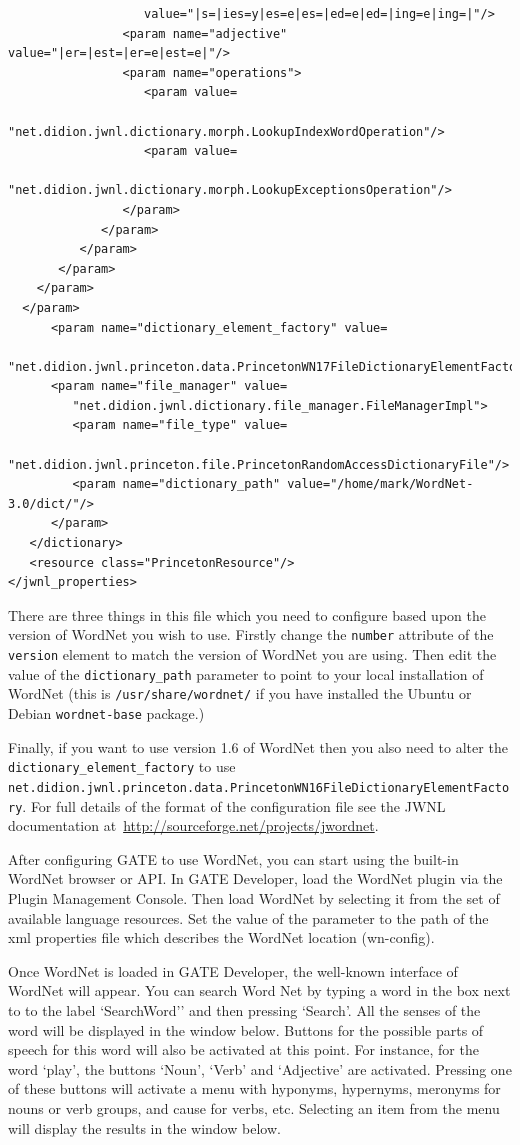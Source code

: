 \begin{small}
\begin{verbatim}
                   value="|s=|ies=y|es=e|es=|ed=e|ed=|ing=e|ing=|"/>
                <param name="adjective" value="|er=|est=|er=e|est=e|"/>
                <param name="operations">
                   <param value=
                      "net.didion.jwnl.dictionary.morph.LookupIndexWordOperation"/>
                   <param value=
                      "net.didion.jwnl.dictionary.morph.LookupExceptionsOperation"/>
                </param>
             </param>
          </param>
       </param>
    </param>
  </param>
      <param name="dictionary_element_factory" value=
         "net.didion.jwnl.princeton.data.PrincetonWN17FileDictionaryElementFactory"/>
      <param name="file_manager" value=
         "net.didion.jwnl.dictionary.file_manager.FileManagerImpl">
         <param name="file_type" value=
            "net.didion.jwnl.princeton.file.PrincetonRandomAccessDictionaryFile"/>
         <param name="dictionary_path" value="/home/mark/WordNet-3.0/dict/"/>
      </param>
   </dictionary>
   <resource class="PrincetonResource"/>
</jwnl_properties>
\end{verbatim}
\end{small}

There are three things in this file which you need to configure based upon the
version of WordNet you wish to use.  Firstly change the \verb|number| attribute
of the \verb|version| element to match the version of WordNet you are using.
Then edit the value of the \verb|dictionary_path| parameter to point to your
local installation of WordNet (this is \verb!/usr/share/wordnet/! if you have
installed the Ubuntu or Debian \texttt{wordnet-base} package.)


Finally, if you want to use version 1.6 of WordNet then you also need to alter
the \verb|dictionary_element_factory| to use
\verb|net.didion.jwnl.princeton.data.PrincetonWN16FileDictionaryElementFactory|. For
full details of the format of the configuration file see the JWNL documentation
at~\url{http://sourceforge.net/projects/jwordnet}.

After configuring GATE to use WordNet, you can start using the
built-in WordNet browser or API. In GATE Developer, load the WordNet
plugin via the Plugin Management Console. Then load WordNet by selecting it from
the set of available language resources. Set the value of the
parameter to the path of the xml properties file which describes the
WordNet location (wn-config).

Once WordNet is loaded in GATE Developer, the well-known interface of
WordNet will appear. You can search Word Net by typing a word in the
box next to to the label `SearchWord'' and then pressing
`Search'. All the senses of the word will be displayed in the window
below.  Buttons for the possible parts of speech for this word will
also be activated at this point.  For instance, for the word `play',
the buttons `Noun', `Verb' and `Adjective' are activated.
Pressing one of these buttons will activate a menu with hyponyms,
hypernyms, meronyms for nouns or verb groups, and cause for verbs,
etc. Selecting an item from the menu will display the results in the
window below.

